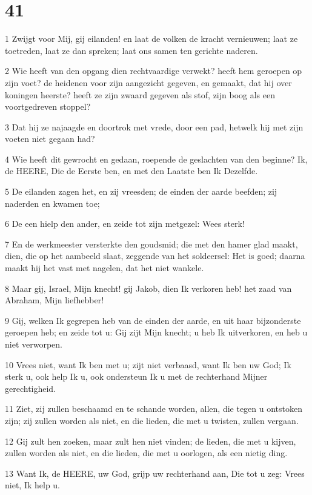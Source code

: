 \chapter{41}

\par 1 Zwijgt voor Mij, gij eilanden! en laat de volken de kracht vernieuwen; laat ze toetreden, laat ze dan spreken; laat ons samen ten gerichte naderen.
\par 2 Wie heeft van den opgang dien rechtvaardige verwekt? heeft hem geroepen op zijn voet? de heidenen voor zijn aangezicht gegeven, en gemaakt, dat hij over koningen heerste? heeft ze zijn zwaard gegeven als stof, zijn boog als een voortgedreven stoppel?
\par 3 Dat hij ze najaagde en doortrok met vrede, door een pad, hetwelk hij met zijn voeten niet gegaan had?
\par 4 Wie heeft dit gewrocht en gedaan, roepende de geslachten van den beginne? Ik, de HEERE, Die de Eerste ben, en met den Laatste ben Ik Dezelfde.
\par 5 De eilanden zagen het, en zij vreesden; de einden der aarde beefden; zij naderden en kwamen toe;
\par 6 De een hielp den ander, en zeide tot zijn metgezel: Wees sterk!
\par 7 En de werkmeester versterkte den goudsmid; die met den hamer glad maakt, dien, die op het aambeeld slaat, zeggende van het soldeersel: Het is goed; daarna maakt hij het vast met nagelen, dat het niet wankele.
\par 8 Maar gij, Israel, Mijn knecht! gij Jakob, dien Ik verkoren heb! het zaad van Abraham, Mijn liefhebber!
\par 9 Gij, welken Ik gegrepen heb van de einden der aarde, en uit haar bijzonderste geroepen heb; en zeide tot u: Gij zijt Mijn knecht; u heb Ik uitverkoren, en heb u niet verworpen.
\par 10 Vrees niet, want Ik ben met u; zijt niet verbaasd, want Ik ben uw God; Ik sterk u, ook help Ik u, ook ondersteun Ik u met de rechterhand Mijner gerechtigheid.
\par 11 Ziet, zij zullen beschaamd en te schande worden, allen, die tegen u ontstoken zijn; zij zullen worden als niet, en die lieden, die met u twisten, zullen vergaan.
\par 12 Gij zult hen zoeken, maar zult hen niet vinden; de lieden, die met u kijven, zullen worden als niet, en die lieden, die met u oorlogen, als een nietig ding.
\par 13 Want Ik, de HEERE, uw God, grijp uw rechterhand aan, Die tot u zeg: Vrees niet, Ik help u.
